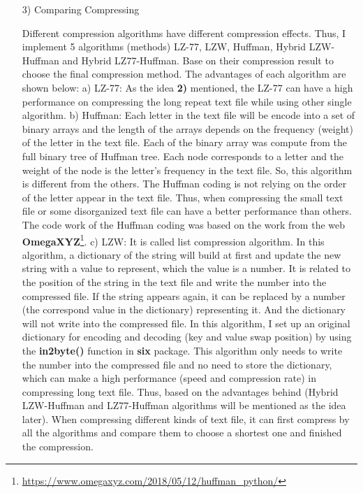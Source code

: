 \documentclass[margin 2cm]{report}
\begin{document}
\begin{enumerate}
\normalsize\item[3)]{Comparing Compressing}
\begin{spacing}{1.5}
\normalsize\indent\setlength{\parindent}{2em}Different compression algorithms have different compression effects. Thus, I implement 5 algorithms (methods) LZ-77, LZW, Huffman, Hybrid LZW-Huffman and Hybrid LZ77-Huffman. Base on their compression result to choose the final compression method. The advantages of each algorithm are shown below:
\newline\normalsize a) LZ-77:   As the idea \textbf{2)} mentioned, the LZ-77 can have a high performance on compressing the long repeat text file while using other single algorithm.
\newline\normalsize b) Huffman:   Each letter in the text file will be encode into a set of binary arrays and the length of the arrays depends on the frequency (weight) of the  letter in the text file. Each of the binary array was compute from the full binary tree of Huffman tree. Each node corresponds to a letter and the weight of the node is the letter's frequency in the text file. So, this algorithm is different from the others. The Huffman coding is not relying on the order of the letter appear in the text file. Thus, when compressing the small text file or some disorganized text file can have a better performance than others. The code work of the Huffman coding was based on the work from the web \textbf{OmegaXYZ}\footnote[1]{\url{https://www.omegaxyz.com/2018/05/12/huffman_python/}}.
\newline\normalsize c) LZW:   It is called list compression algorithm. In this algorithm, a dictionary of the string will build at first and update the new string with a value to represent, which the value is a number. It is related to the position of the string in the text file and write the number into the compressed file. If the string appears again, it can be replaced by a number (the correspond value in the dictionary) representing it. And the dictionary will not write into the compressed file. In this algorithm, I set up an original dictionary for encoding and decoding (key and value swap position) by using the \textbf{in2byte()} function in \textbf{six} package. This algorithm only needs to write the number into the compressed file and no need to store the dictionary, which can make a high performance (speed and compression rate) in compressing long text file.
\newline Thus, based on the advantages behind (Hybrid LZW-Huffman and LZ77-Huffman algorithms will be mentioned as the idea later). When compressing different kinds of text file, it can first compress by all the algorithms and compare them to choose a shortest one and finished the compression.
\end{spacing}


\end{enumerate}
\end{document}
